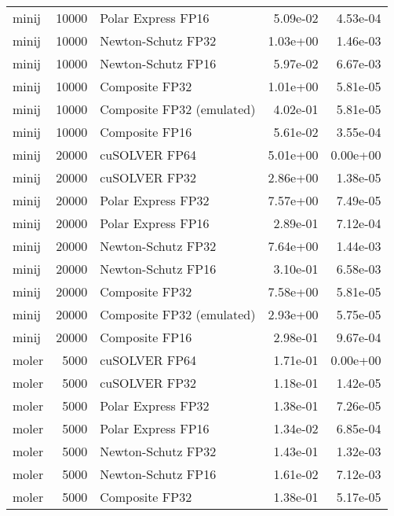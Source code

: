 \begin{table}
\begin{tabular}{lrlrr}
    minij & 10000 &        Polar Express FP16 &  5.09e-02 &        4.53e-04 \\
    minij & 10000 &        Newton-Schutz FP32 &  1.03e+00 &        1.46e-03 \\
    minij & 10000 &        Newton-Schutz FP16 &  5.97e-02 &        6.67e-03 \\
    minij & 10000 &            Composite FP32 &  1.01e+00 &        5.81e-05 \\
    minij & 10000 & Composite FP32 (emulated) &  4.02e-01 &        5.81e-05 \\
    minij & 10000 &            Composite FP16 &  5.61e-02 &        3.55e-04 \\
    minij & 20000 &             cuSOLVER FP64 &  5.01e+00 &        0.00e+00 \\
    minij & 20000 &             cuSOLVER FP32 &  2.86e+00 &        1.38e-05 \\
    minij & 20000 &        Polar Express FP32 &  7.57e+00 &        7.49e-05 \\
    minij & 20000 &        Polar Express FP16 &  2.89e-01 &        7.12e-04 \\
    minij & 20000 &        Newton-Schutz FP32 &  7.64e+00 &        1.44e-03 \\
    minij & 20000 &        Newton-Schutz FP16 &  3.10e-01 &        6.58e-03 \\
    minij & 20000 &            Composite FP32 &  7.58e+00 &        5.81e-05 \\
    minij & 20000 & Composite FP32 (emulated) &  2.93e+00 &        5.75e-05 \\
    minij & 20000 &            Composite FP16 &  2.98e-01 &        9.67e-04 \\
    moler &  5000 &             cuSOLVER FP64 &  1.71e-01 &        0.00e+00 \\
    moler &  5000 &             cuSOLVER FP32 &  1.18e-01 &        1.42e-05 \\
    moler &  5000 &        Polar Express FP32 &  1.38e-01 &        7.26e-05 \\
    moler &  5000 &        Polar Express FP16 &  1.34e-02 &        6.85e-04 \\
    moler &  5000 &        Newton-Schutz FP32 &  1.43e-01 &        1.32e-03 \\
    moler &  5000 &        Newton-Schutz FP16 &  1.61e-02 &        7.12e-03 \\
    moler &  5000 &            Composite FP32 &  1.38e-01 &        5.17e-05 \\

\end{tabular}
\end{table}
